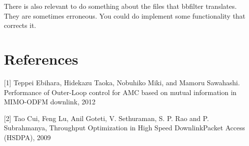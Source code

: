 \documentclass[cropmarks, frame, english]{idamasterthesis}
\begin{document}
There is also relevant to do something about the files that bbfilter translates. They are sometimes erroneous. You could do implement some functionality that corrects it.


\section*{References}
[1] Teppei Ebihara, Hidekazu Taoka, Nobuhiko Miki, and Mamoru Sawahashi. Performance of Outer-Loop control for AMC based on mutual information in MIMO-ODFM downlink, 2012

[2] Tao Cui, Feng Lu, Anil Goteti, V. Sethuraman, S. P. Rao and P. Subrahmanya, Throughput Optimization in High Speed DownlinkPacket Access (HSDPA), 2009
\end{document}
